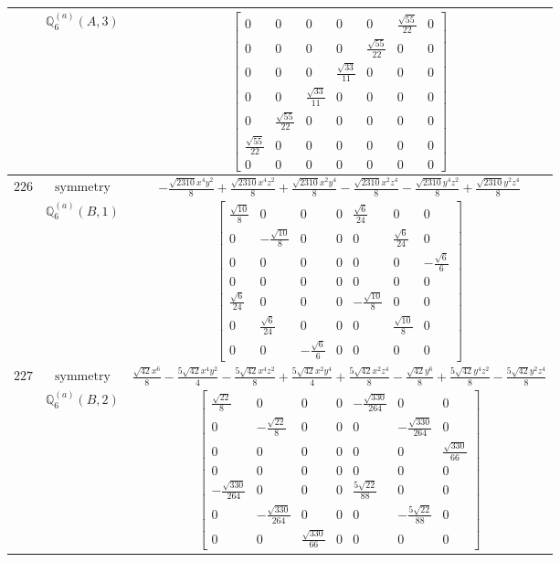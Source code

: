 \documentclass[fleqn,8pt,landscape]{jsarticle}
\begin{document}
\begin{longtable}{ccc}
$  $ & $ \mathbb{Q}_{6}^{(a)}(A,3) $ & $ \begin{bmatrix} 0 & 0 & 0 & 0 & 0 & \frac{\sqrt{55}}{22} & 0 \\ 0 & 0 & 0 & 0 & \frac{\sqrt{55}}{22} & 0 & 0 \\ 0 & 0 & 0 & \frac{\sqrt{33}}{11} & 0 & 0 & 0 \\ 0 & 0 & \frac{\sqrt{33}}{11} & 0 & 0 & 0 & 0 \\ 0 & \frac{\sqrt{55}}{22} & 0 & 0 & 0 & 0 & 0 \\ \frac{\sqrt{55}}{22} & 0 & 0 & 0 & 0 & 0 & 0 \\ 0 & 0 & 0 & 0 & 0 & 0 & 0 \end{bmatrix} $ \\ \hline
$ 226 $ & $ \text{symmetry} $ & $ - \frac{\sqrt{2310} x^{4} y^{2}}{8} + \frac{\sqrt{2310} x^{4} z^{2}}{8} + \frac{\sqrt{2310} x^{2} y^{4}}{8} - \frac{\sqrt{2310} x^{2} z^{4}}{8} - \frac{\sqrt{2310} y^{4} z^{2}}{8} + \frac{\sqrt{2310} y^{2} z^{4}}{8} $ \\
$  $ & $ \mathbb{Q}_{6}^{(a)}(B,1) $ & $ \begin{bmatrix} \frac{\sqrt{10}}{8} & 0 & 0 & 0 & \frac{\sqrt{6}}{24} & 0 & 0 \\ 0 & - \frac{\sqrt{10}}{8} & 0 & 0 & 0 & \frac{\sqrt{6}}{24} & 0 \\ 0 & 0 & 0 & 0 & 0 & 0 & - \frac{\sqrt{6}}{6} \\ 0 & 0 & 0 & 0 & 0 & 0 & 0 \\ \frac{\sqrt{6}}{24} & 0 & 0 & 0 & - \frac{\sqrt{10}}{8} & 0 & 0 \\ 0 & \frac{\sqrt{6}}{24} & 0 & 0 & 0 & \frac{\sqrt{10}}{8} & 0 \\ 0 & 0 & - \frac{\sqrt{6}}{6} & 0 & 0 & 0 & 0 \end{bmatrix} $ \\ \hline
$ 227 $ & $ \text{symmetry} $ & $ \frac{\sqrt{42} x^{6}}{8} - \frac{5 \sqrt{42} x^{4} y^{2}}{4} - \frac{5 \sqrt{42} x^{4} z^{2}}{8} + \frac{5 \sqrt{42} x^{2} y^{4}}{4} + \frac{5 \sqrt{42} x^{2} z^{4}}{8} - \frac{\sqrt{42} y^{6}}{8} + \frac{5 \sqrt{42} y^{4} z^{2}}{8} - \frac{5 \sqrt{42} y^{2} z^{4}}{8} $ \\
$  $ & $ \mathbb{Q}_{6}^{(a)}(B,2) $ & $ \begin{bmatrix} \frac{\sqrt{22}}{8} & 0 & 0 & 0 & - \frac{\sqrt{330}}{264} & 0 & 0 \\ 0 & - \frac{\sqrt{22}}{8} & 0 & 0 & 0 & - \frac{\sqrt{330}}{264} & 0 \\ 0 & 0 & 0 & 0 & 0 & 0 & \frac{\sqrt{330}}{66} \\ 0 & 0 & 0 & 0 & 0 & 0 & 0 \\ - \frac{\sqrt{330}}{264} & 0 & 0 & 0 & \frac{5 \sqrt{22}}{88} & 0 & 0 \\ 0 & - \frac{\sqrt{330}}{264} & 0 & 0 & 0 & - \frac{5 \sqrt{22}}{88} & 0 \\ 0 & 0 & \frac{\sqrt{330}}{66} & 0 & 0 & 0 & 0 \end{bmatrix} $ \\ \hline

\end{longtable}
\end{document}
